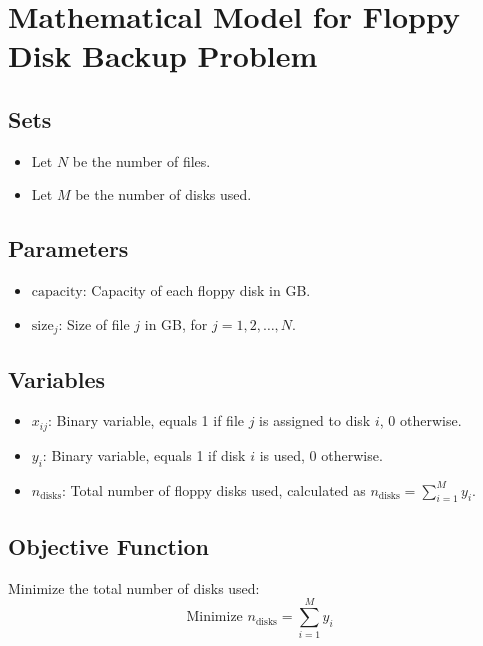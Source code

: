 \documentclass{article}
\begin{document}
\section*{Mathematical Model for Floppy Disk Backup Problem}

\subsection*{Sets}
\begin{itemize}
    \item Let \( N \) be the number of files.
    \item Let \( M \) be the number of disks used.
\end{itemize}

\subsection*{Parameters}
\begin{itemize}
    \item \( \text{capacity} \): Capacity of each floppy disk in GB.
    \item \( \text{size}_j \): Size of file \( j \) in GB, for \( j = 1, 2, \ldots, N \).
\end{itemize}

\subsection*{Variables}
\begin{itemize}
    \item \( x_{ij} \): Binary variable, equals 1 if file \( j \) is assigned to disk \( i \), 0 otherwise.
    \item \( y_i \): Binary variable, equals 1 if disk \( i \) is used, 0 otherwise.
    \item \( n_{\text{disks}} \): Total number of floppy disks used, calculated as \( n_{\text{disks}} = \sum_{i=1}^{M} y_i \).
\end{itemize}

\subsection*{Objective Function}
Minimize the total number of disks used:
\[
\text{Minimize } n_{\text{disks}} = \sum_{i=1}^{M} y_i
\]
\end{document}
